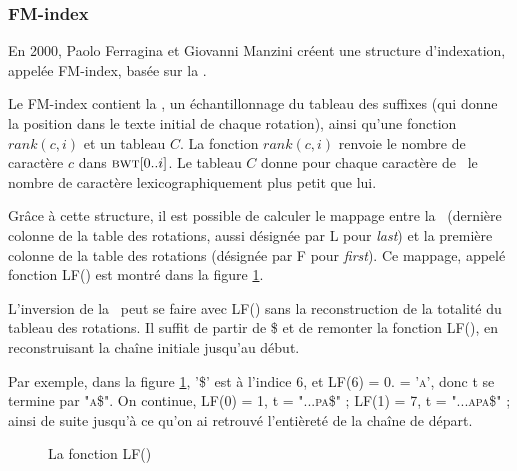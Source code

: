 \subsubsection{FM-index}

En 2000, Paolo Ferragina et Giovanni Manzini créent une structure d'indexation, appelée FM-index, basée sur la \bwt. 

Le FM-index contient la \bwt, un échantillonnage du tableau des suffixes (qui donne la position dans le texte initial de chaque rotation), ainsi qu'une fonction $rank(c, i)$  et un tableau $C$.
La fonction $rank(c, i)$ renvoie  le nombre de caractère $c$ dans $\textsc{bwt}[0..i]$. Le tableau $C$ donne pour chaque caractère de \bwt\ le nombre de caractère lexicographiquement plus petit que lui.

Grâce à cette structure, il est possible de calculer le mappage entre la \bwt\ (dernière colonne de la table des rotations, aussi désignée par L pour \textit{last}) et la première colonne de la table des rotations (désignée par F pour \textit{first}). Ce mappage, appelé fonction LF() est montré dans la figure \ref{lf}.

L'inversion de la \bwt\ peut se faire avec LF() sans la reconstruction de la totalité du tableau des rotations. 
Il suffit de partir de \$ et de remonter la fonction LF(), en reconstruisant la chaîne initiale jusqu'au début.

Par exemple, dans la figure \ref{lf}, '\$' est à l'indice 6, et LF(6) = 0. \bwt[0] = \textsc{'a'}, donc t se termine par \textsc{"a\$"}. On continue, LF(0) = 1, t = \textsc{"...pa\$"} ; LF(1) = 7, t = \textsc{"...apa\$"} ; ainsi de suite jusqu'à ce qu'on ai retrouvé l'entièreté de la chaîne de départ.

\begin{figure}[h!]
\caption{La fonction LF()}
\label{lf} 
\end{figure}

